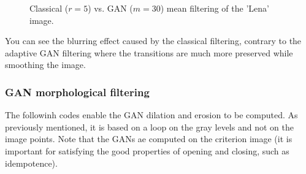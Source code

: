 \begin{figure}[htbp]
\centering
 \hfill
 \hfill
 \caption{Classical ($r=5$) vs. GAN ($m=30$) mean filtering of the 'Lena' image.}
\end{figure}

\noindent You can see the blurring effect caused by the classical filtering, contrary to the adaptive GAN filtering where the transitions are much more preserved while smoothing the image. 

\subsubsection{GAN morphological filtering}
The followinh codes enable the GAN dilation and erosion to be computed. As previously mentioned, it is based on a loop on the gray levels and not on the image points. Note that the GANs ae computed on the criterion image (it is important for satisfying the good properties of opening and closing, such as idempotence).

